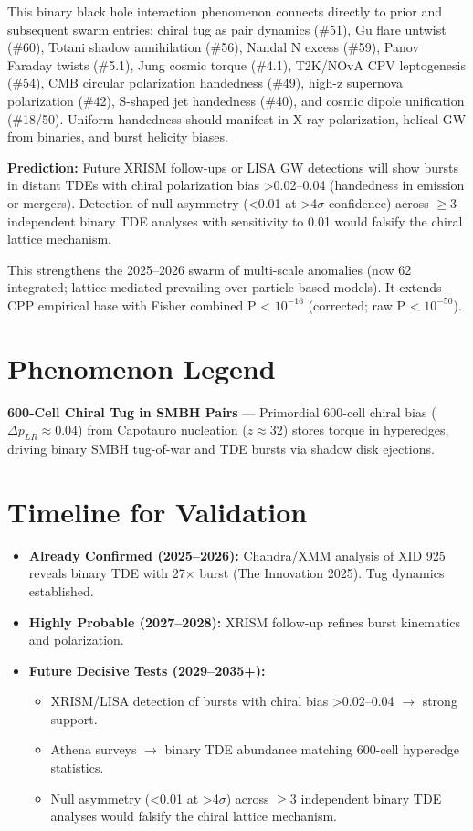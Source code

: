 \documentclass[11pt]{article}
\begin{document}
This binary black hole interaction phenomenon connects directly to prior and subsequent swarm entries: chiral tug as pair dynamics (\#51), Gu flare untwist (\#60), Totani shadow annihilation (\#56), Nandal N excess (\#59), Panov Faraday twists (\#5.1), Jung cosmic torque (\#4.1), T2K/NOvA CPV leptogenesis (\#54), CMB circular polarization handedness (\#49), high-z supernova polarization (\#42), S-shaped jet handedness (\#40), and cosmic dipole unification (\#18/50). Uniform handedness should manifest in X-ray polarization, helical GW from binaries, and burst helicity biases.

\textbf{Prediction:} Future XRISM follow-ups or LISA GW detections will show bursts in distant TDEs with chiral polarization bias >0.02--0.04 (handedness in emission or mergers). Detection of null asymmetry (<0.01 at >4$\sigma$ confidence) across $\geq 3$ independent binary TDE analyses with sensitivity to 0.01 would falsify the chiral lattice mechanism.

This strengthens the 2025--2026 swarm of multi-scale anomalies (now 62 integrated; lattice-mediated prevailing over particle-based models). It extends CPP empirical base with Fisher combined P < $10^{-16}$ (corrected; raw P < $10^{-50}$).

\section{Phenomenon Legend}
\textbf{600-Cell Chiral Tug in SMBH Pairs} — Primordial 600-cell chiral bias ($\Delta p_{LR} \approx 0.04$) from Capotauro nucleation ($z \approx 32$) stores torque in hyperedges, driving binary SMBH tug-of-war and TDE bursts via shadow disk ejections.

\section{Timeline for Validation}
\begin{itemize}
    \item \textbf{Already Confirmed (2025--2026):} Chandra/XMM analysis of XID 925 reveals binary TDE with 27$\times$ burst (The Innovation 2025). Tug dynamics established.
    \item \textbf{Highly Probable (2027--2028):} XRISM follow-up refines burst kinematics and polarization.
    \item \textbf{Future Decisive Tests (2029--2035+):}
    \begin{itemize}
        \item XRISM/LISA detection of bursts with chiral bias >0.02--0.04 $\to$ strong support.
        \item Athena surveys $\to$ binary TDE abundance matching 600-cell hyperedge statistics.
        \item Null asymmetry (<0.01 at >4$\sigma$) across $\geq 3$ independent binary TDE analyses would falsify the chiral lattice mechanism.
    \end{itemize}
\end{itemize}
\end{document}
